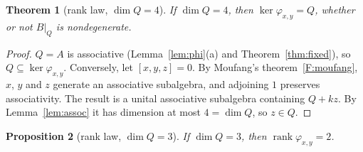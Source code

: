 \documentclass[11pt]{amsart}
\newtheorem{theorem}{Theorem}[section]
\newtheorem{proposition}[theorem]{Proposition}
\theoremstyle{definition}
\theoremstyle{remark}
\newcommand{\assoc}[3]{[#1,#2,#3]}
\DeclareMathOperator{\rank}{rank}
\begin{document}
\begin{theorem}[rank law, $\dim Q=4$]\label{thm:rank-four}
If $\dim Q=4$, then $\ker\varphi_{x,y}=Q$, whether or not $B|_Q$ is
nondegenerate.
\end{theorem}

\begin{proof}
$Q=A$ is associative (Lemma~\ref{lem:phi}(a) and Theorem~\ref{thm:fixed}), so
$Q\subseteq\ker\varphi_{x,y}$. Conversely, let $\assoc xyz=0$. By Moufang's
theorem~\ref{F:moufang}, $x$, $y$ and $z$ generate an associative subalgebra,
and adjoining $1$ preserves associativity. The result is a unital
associative subalgebra containing $Q+kz$. By Lemma~\ref{lem:assoc} it has
dimension at most $4=\dim Q$, so $z\in Q$.
\end{proof}

\begin{proposition}[rank law, $\dim Q=3$]\label{prop:rank-three}
If $\dim Q=3$, then $\rank\varphi_{x,y}=2$.
\end{proposition}
\end{document}
